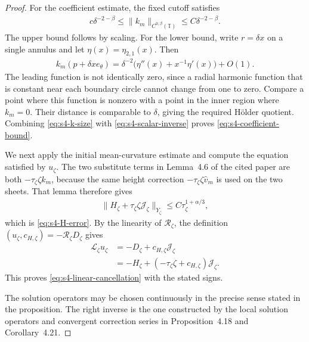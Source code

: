 \documentclass[a4paper,11pt,oneside,reqno]{amsart}
\numberwithin{equation}{section}
\theoremstyle{definition}
\begin{document}
\begin{proof}
    For the coefficient estimate, the fixed cutoff satisfies
    \begin{align}
        \label{eq:s4-k-size}
        c\delta^{-2-\beta}\leq\|k_m\|_{C^{0,\beta}(\mathbb{T})}
        \leq C\delta^{-2-\beta}.
    \end{align}
    The upper bound follows by scaling. For the lower bound,
    write $r=\delta x$ on a single annulus and let
    $\eta(x)=\eta_{2,1}(x)$. Then
    \begin{align*}
        k_m(p+\delta x e_\theta)
        =\delta^{-2}\bigl(\eta''(x)+x^{-1}\eta'(x)\bigr)+O(1).
    \end{align*}
    The leading function is not identically zero, since a radial
    harmonic function that is constant near each boundary circle
    cannot change from one to zero. Compare a point where this
    function is nonzero with a point in the inner region where
    $k_m=0$. Their distance is comparable to $\delta$, giving
    the required H\"older quotient. Combining
    \eqref{eq:s4-k-size} with \eqref{eq:s4-scalar-inverse}
    proves \eqref{eq:s4-coefficient-bound}.

    We next apply the initial mean-curvature estimate and
    compute the equation satisfied by $u_\zeta$.
    The two substitute terms in Lemma~4.6 of the cited paper
    are both $-\tau_\zeta\zeta k_m$, because the same height
    correction $-\tau_\zeta\zeta\widehat v_m$ is used on
    the two sheets. That lemma therefore gives
    \begin{align*}
        \|H_\zeta+\tau_\zeta\zeta\mathcal J_\zeta\|_{Y_\zeta}
        \leq C\tau_\zeta^{1+\alpha/3},
    \end{align*}
    which is \eqref{eq:s4-H-error}. By the linearity of
    $\mathscr R_\zeta$, the definition
    $(u_\zeta,c_{H,\zeta})=-\mathscr R_\zeta D_\zeta$
    gives
    \begin{align*}
        \mathcal L_\zeta u_\zeta
        &=-D_\zeta+c_{H,\zeta}\mathcal J_\zeta\\
        &=-H_\zeta+
          (-\tau_\zeta\zeta+c_{H,\zeta})\mathcal J_\zeta.
    \end{align*}
    This proves \eqref{eq:s4-linear-cancellation} with the
    stated signs.

    The solution operators may be chosen continuously in
    the precise sense stated in the proposition.
    The right inverse is the one constructed by the local
    solution operators and convergent correction series in
    Proposition~4.18 and Corollary~4.21. 
    

\end{proof}
\end{document}
